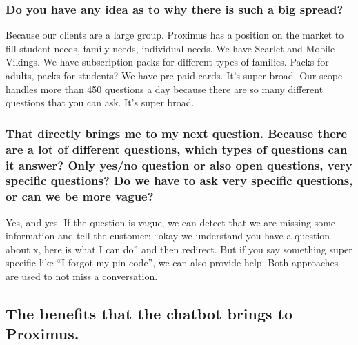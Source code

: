 \begin{appendices}
	\subsubsection{Do you have any idea as to why there is such a big spread?}
	Because our clients are a large group. Proximus has a position on the market to fill student needs, family needs, individual needs. We have Scarlet and Mobile Vikings. We have subscription packs for different types of families. Packs for adults, packs for students? We have pre-paid cards. It’s super broad. Our scope handles more than 450 questions a day because there are so many different questions that you can ask. It’s super broad.
	
	\subsubsection{That directly brings me to my next question. Because there are a lot of different questions, which types of questions can it answer? Only yes/no question or also open questions, very specific questions? Do we have to ask very specific questions, or can we be more vague?}
	Yes, and yes. If the question is vague, we can detect that we are missing some information and tell the customer: “okay we understand you have a question about x, here is what I can do” and then redirect. But if you say something super specific like “I forgot my pin code”, we can also provide help. Both approaches are used to not miss a conversation.
	
	\subsection{The benefits that the chatbot brings to Proximus.}

\end{appendices}
